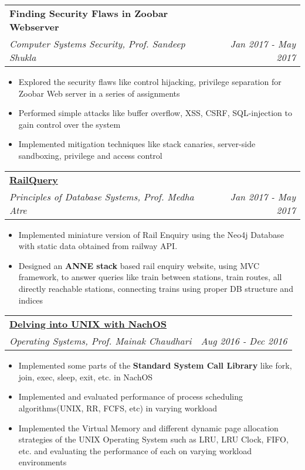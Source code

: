 \documentclass[letterpaper,11pt]{article}
\makeatletter
\newcommand{\resumeItem}[1]{
  \item\small{
    #1 \vspace{-2pt}
  }
}
\newcommand{\resumeSubheadingSpecial}[4]{
  \vspace{-1pt}\item
    \begin{tabular*}{0.97\textwidth}{l@{\extracolsep{\fill}}r}
      \textbf{#1} & #2 \\
      \textit{\small#3} & \textit{\small #4} \\
    \end{tabular*}\vspace{-5pt}
}
\newcommand{\resumeItemListStart}{\begin{itemize}[leftmargin=5mm]}
\newcommand{\resumeItemListEnd}{\end{itemize}\vspace{-5pt}}
\makeatother
\begin{document}
    \resumeSubheadingSpecial
      {Finding Security Flaws in Zoobar Webserver}
      {}{Computer Systems Security, Prof. Sandeep Shukla}{Jan 2017 - May 2017}
      \resumeItemListStart
        \resumeItem
          {Explored the security flaws like control hijacking, privilege separation for Zoobar Web server in a series of assignments}
        \resumeItem
          {Performed simple attacks like buffer overflow, XSS, CSRF, SQL-injection to gain control over the system}
        \resumeItem
          {Implemented mitigation techniques like stack canaries, server-side sandboxing, privilege and access control}
      \resumeItemListEnd

    \resumeSubheadingSpecial
      {\href{https://github.com/tulsyan/railquery}{RailQuery}}
      {}{Principles of Database Systems, Prof. Medha Atre}{Jan 2017 - May 2017}
      \resumeItemListStart
        \resumeItem
          {Implemented miniature version of Rail Enquiry using the Neo4j Database with static data obtained from railway API.}
        \resumeItem
          {Designed an \textbf{ANNE stack} based rail enquiry website, using MVC framework, to answer queries like train between stations, train routes, all directly reachable stations, connecting trains using proper DB structure and indices}
      \resumeItemListEnd
      
    \resumeSubheadingSpecial
      {\href{https://bitbucket.org/arhamchopra11/nachos-assignments}{Delving into UNIX with NachOS}}
      {}{Operating Systems, Prof. Mainak Chaudhari}{Aug 2016 - Dec 2016}
      \resumeItemListStart
        \resumeItem
          {Implemented some parts of the \textbf{Standard System Call Library} like fork, join, exec, sleep, exit, etc. in NachOS}
        \resumeItem
          {Implemented and evaluated performance of process scheduling algorithms(UNIX, RR, FCFS, etc) in varying workload}
        \resumeItem
          {Implemented the Virtual Memory and different dynamic page allocation strategies of the UNIX Operating System such as LRU, LRU Clock, FIFO, etc. and evaluating the performance of each on varying workload environments}
      \resumeItemListEnd
      
\end{document}
